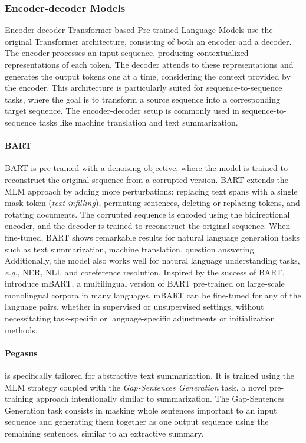 \subsubsection{Encoder-decoder Models}

Encoder-decoder Transformer-based Pre-trained Language Models use the original Transformer architecture, consisting of both an encoder and a decoder. The encoder processes an input sequence, producing contextualized representations of each token. The decoder attends to these representations and generates the output tokens one at a time, considering the context provided by the encoder. This architecture is particularly suited for sequence-to-sequence tasks, where the goal is to transform a source sequence into a corresponding target sequence. The encoder-decoder setup is commonly used in sequence-to-sequence tasks like machine translation and text summarization.

\paragraph{BART} \ac{BART} \citep{lewis2019bart} is pre-trained with a denoising objective, where the model is trained to reconstruct the original sequence from a corrupted version. \ac{BART} extends the \ac{MLM} approach by adding more perturbations: replacing text spans with a single mask token (\textit{text infilling}), permuting sentences, deleting or replacing tokens, and rotating documents. The corrupted sequence is encoded using the bidirectional encoder, and the decoder is trained to reconstruct the original sequence. When fine-tuned, \ac{BART} shows remarkable results for natural language generation tasks such as text summarization, machine translation, question answering. Additionally, the model also works well for natural language understanding tasks, \textit{e.g.}, \ac{NER}, \ac{NLI}, and coreference resolution. Inspired by the success of \ac{BART}, \citet{liu2020multilingual} introduce mBART, a multilingual version of \ac{BART} pre-trained on large-scale monolingual corpora in many languages. mBART can be fine-tuned for any of the language pairs, whether in supervised or unsupervised settings, without necessitating task-specific or language-specific adjustments or initialization methods.

\paragraph{Pegasus} \citep{zhang2020pegasus} is specifically tailored for abstractive text summarization. It is trained using the \ac{MLM} strategy coupled with the \textit{Gap-Sentences Generation} task, a novel pre-training approach intentionally similar to summarization. The Gap-Sentences Generation task consists in masking whole sentences important to an input sequence and generating them together as one output sequence using the remaining sentences, similar to an extractive summary. 

